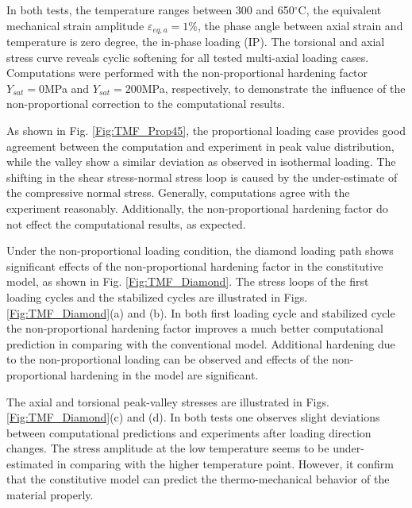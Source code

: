 \documentclass[preprint,5p,twocolumn,11pt,sort&compress]{elsarticle}
\begin{document}
In both tests, the temperature ranges between 300 and 650$^{\circ}$C, the equivalent mechanical strain amplitude $\varepsilon_{eq,a}=1\%$, the phase angle between axial strain and temperature is zero degree, the in-phase loading (IP).
The torsional and axial stress curve reveals cyclic softening for all tested multi-axial loading cases.
Computations were performed with the non-proportional hardening factor $Y_{sat}=0$MPa and $Y_{sat}=200$MPa, respectively, to demonstrate the influence of the non-proportional correction to the computational results.

As shown in Fig. \ref{Fig:TMF_Prop45}, the proportional loading case provides good agreement between the computation and experiment in peak value distribution, while the valley show a similar deviation as observed in isothermal loading. The shifting in the shear stress-normal stress loop is caused by the under-estimate of the compressive normal stress. Generally, computations agree with the experiment reasonably. Additionally, the non-proportional hardening factor do not effect the computational results, as expected.

Under the non-proportional loading condition, the diamond loading path shows significant effects of the non-proportional hardening factor  in the constitutive model, as shown in Fig. \ref{Fig:TMF_Diamond}. The stress loops of the first loading cycles and the stabilized cycles are illustrated in Figs. \ref{Fig:TMF_Diamond}(a) and (b). In both first loading cycle and stabilized cycle the non-proportional hardening factor improves a much better computational prediction in comparing with the conventional model. Additional hardening due to the non-proportional loading can be observed and effects of the non-proportional hardening in the model are significant.

The axial and torsional peak-valley stresses are illustrated in  Figs. \ref{Fig:TMF_Diamond}(c) and (d).
In both tests one observes slight deviations between computational predictions and experiments after  loading direction changes. The stress amplitude at the low temperature seems to be under-estimated in comparing with the higher temperature point. However, it confirm that the constitutive model can predict the thermo-mechanical behavior of the material properly.

\end{document}
